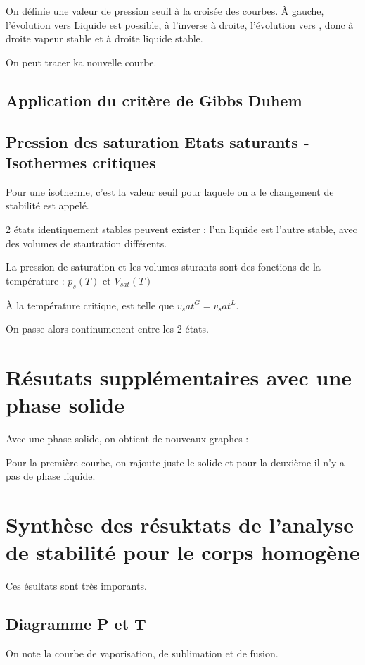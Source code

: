 \documentclass[french]{yLectureNote}
\begin{document}
On définie une valeur de pression seuil à la croisée des courbes. À gauche, l'évolution vers Liquide est possible, à l'inverse à droite, l'évolution vers , donc à droite vapeur stable et à droite liquide stable.

On peut tracer ka nouvelle courbe.



\subsection{Application du critère de Gibbs Duhem}

\subsection{Pression des saturation Etats saturants - Isothermes critiques}
\begin{definition}
    Pour une isotherme, c'est la valeur seuil pour laquele on a le changement de stabilité est appelé. 
\end{definition}
\begin{definition}
    2 états identiquement stables peuvent exister : l'un liquide est l'autre stable, avec des volumes de stautration différents.
\end{definition}
La pression de saturation et les volumes sturants sont des fonctions de la température : $p_s(T)$ et $V_{sat}(T)$

À la température critique, est telle que $v_sat^G = v_sat^L$.

On passe alors continumenent entre les 2 états.

\section{Résutats supplémentaires avec une phase solide}
Avec une phase solide, 
on obtient de nouveaux graphes :

Pour la première courbe, on rajoute juste le solide et pour la deuxième il n'y a pas de phase liquide.

\section{Synthèse des résuktats de l'analyse de stabilité pour le corps homogène}
Ces ésultats sont très imporants.
\subsection{Diagramme P et T}
On note la courbe de vaporisation, de sublimation et de fusion.
\end{document}

